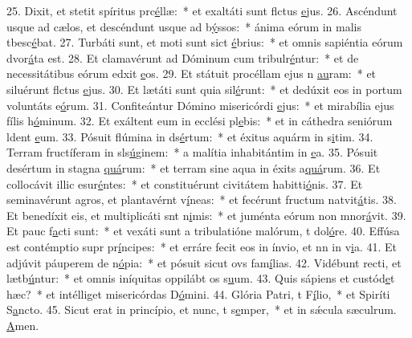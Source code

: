 25. Dixit, et stetit spíritus prc\uline{é}llæ:~* et exaltáti sunt flctus \uline{e}jus.
26. Ascéndunt usque ad cælos, et descéndunt usque ad b\uline{ý}ssos:~* ánima eórum in malis tbesc\uline{é}bat.
27. Turbáti sunt, et moti sunt sict \uline{é}brius:~* et omnis sapiéntia eórum dvor\uline{á}ta est.
28. Et clamavérunt ad Dóminum cum tribulr\uline{é}ntur:~* et de necessitátibus eórum edxit \uline{e}os.
29. Et státuit procéllam ejus n \uline{au}ram:~* et siluérunt flctus \uline{e}jus.
30. Et lætáti sunt quia sil\uline{é}runt:~* et dedúxit eos in portum voluntáts e\uline{ó}rum.
31. Confiteántur Dómino misericórdi \uline{e}jus:~* et mirabília ejus fílis h\uline{ó}minum.
32. Et exáltent eum in ecclési pl\uline{e}bis:~* et in cáthedra seniórum ldent \uline{e}um.
33. Pósuit flúmina in ds\uline{é}rtum:~* et éxitus aquárm in s\uline{i}tim.
34. Terram fructíferam in sls\uline{ú}ginem:~* a malítia inhabitántim in \uline{e}a.
35. Pósuit desértum in stagna \uline{quá}rum:~* et terram sine aqua in éxits a\uline{quá}rum.
36. Et collocávit illic esur\uline{é}ntes:~* et constituérunt civitátem habitti\uline{ó}nis.
37. Et seminavérunt agros, et plantavérnt v\uline{í}neas:~* et fecérunt fructum natvit\uline{á}tis.
38. Et benedíxit eis, et multiplicáti snt n\uline{i}mis:~* et juménta eórum non mnor\uline{á}vit.
39. Et pauc f\uline{a}cti sunt:~* et vexáti sunt a tribulatióne malórum, t dol\uline{ó}re.
40. Effúsa est contémptio supr pr\uline{í}ncipes:~* et erráre fecit eos in ínvio, et nn in v\uline{i}a.
41. Et adjúvit páuperem de n\uline{ó}pia:~* et pósuit sicut ovs fam\uline{í}lias.
42. Vidébunt recti, et lætb\uline{ú}ntur:~* et omnis iníquitas oppilábt os s\uline{u}um.
43. Quis sápiens et custód\uline{e}t hæc?~* et intélliget misericórdas D\uline{ó}mini.
44. Glória Patri, t F\uline{í}lio,~* et Spiríti S\uline{a}ncto.
45. Sicut erat in princípio, et nunc, t s\uline{e}mper,~* et in sǽcula sæculrum. \uline{A}men.
